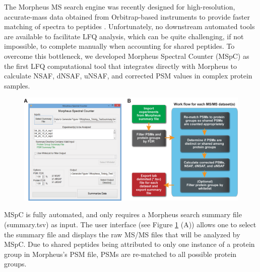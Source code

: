 The Morpheus MS search engine was recently designed for high-resolution, accurate-mass data obtained from Orbitrap-based instruments to provide faster matching of spectra to peptides \citep{wenger13}.
Unfortunately, no downstream automated tools are available to facilitate LFQ analysis, which can be quite challenging, if not impossible, to complete manually when accounting for shared peptides.
To overcome this bottleneck, we developed Morpheus Spectral Counter (MSpC) as the first LFQ computational tool that integrates directly with Morpheus to calculate NSAF, dNSAF, uNSAF, and corrected PSM \citep{fermin11} values in complex protein samples.
\begin{figure}
	\centering
	\includegraphics[width=\columnwidth]{MSpC/figure1_supplemental.png}
	\label{fig:GUIflow}
\end{figure}
MSpC is fully automated, and only requires a Morpheus search summary file (summary.tsv) as input.
The user interface (see Figure \ref{fig:GUIflow} (A)) allows one to select the summary file and displays the raw MS/MS files that will be analyzed by MSpC.
Due to shared peptides being attributed to only one instance of a protein group in Morpheus's PSM file, PSMs are re-matched to all possible protein groups.
